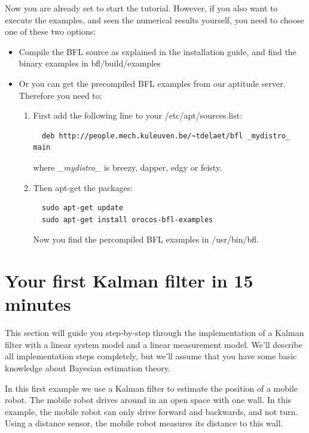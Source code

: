 \documentclass[a4paper,10pt]{report}
\begin{document}
Now you are already set to start the tutorial. However, if you also
want to execute the examples, and seen the numerical results yourself,
you need to choose one of these two options:
\begin{itemize}
\item Compile the BFL source as explained in the installation guide,
  and find the binary examples in bfl/build/examples
\item Or you can get the precompiled BFL examples from our aptitude
  server. Therefore you need to:\
\begin{enumerate}
\item First add the following line to your /etc/apt/sources.list:
\begin{verbatim}
  deb http://people.mech.kuleuven.be/~tdelaet/bfl _mydistro_ main
\end{verbatim}
  where \emph{\_mydistro\_} is breezy, dapper, edgy or feisty.
\item Then apt-get the packages:
\begin{verbatim}
  sudo apt-get update
  sudo apt-get install orocos-bfl-examples
\end{verbatim}
Now you find the percompiled BFL examples in /usr/bin/bfl.
\end{enumerate}
\end{itemize}






\pagebreak
\section{Your first Kalman filter in 15 minutes}
This section will guide you step-by-step through the implementation of
a Kalman filter with a linear system model and a linear measurement
model. We'll describe all implementation steps completely, but we'll
assume that you have some basic knowledge about Bayesian estimation
theory.

In this first example we use a Kalman filter to estimate the position
of a mobile robot. The mobile robot drives around in an open space
with one wall. In this example, the mobile robot can only drive
forward and backwards, and not turn. Using a distance sensor, the
mobile robot measures its distance to this wall.
\end{document}
